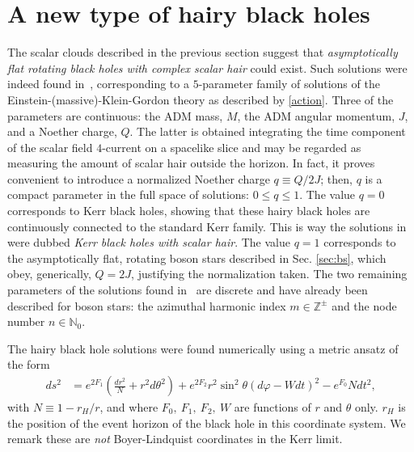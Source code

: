 \section{A new type of hairy black holes}
\label{sec:HBHs}
The scalar clouds described in the previous section suggest that \textit{asymptotically flat rotating black holes with complex scalar hair} could exist.
Such solutions were indeed found in~\cite{Herdeiro:2014goa}, corresponding to a $5$-parameter family of solutions of the Einstein-(massive)-Klein-Gordon theory as described by \eqref{action}.
Three of the parameters are continuous: the ADM mass, $M$, the ADM angular momentum, $J$, and a Noether charge, $Q$.
The latter is obtained integrating the time component of the scalar field $4$-current on a spacelike slice and may be regarded as measuring the amount of scalar hair outside the horizon.
In fact, it proves convenient to introduce a normalized Noether charge $q\equiv Q/2J$; then, $q$ is a compact parameter in the full space of solutions: $0\le q\le 1$.
The value $q=0$ corresponds to Kerr black holes, showing that these hairy black holes are continuously connected to the standard Kerr family.
This is way the solutions in~\cite{Herdeiro:2014goa} were dubbed \textit{Kerr black holes with scalar hair}.
The value $q=1$ corresponds to the asymptotically flat, rotating boson stars described in Sec. \ref{sec:bs}, which obey, generically, $Q=2J$, justifying the normalization taken.
The two remaining parameters of the solutions found in~\cite{Herdeiro:2014goa} are discrete and have already been described for boson stars: the azimuthal harmonic index $m\in \mathbb{Z}^\pm$ and the node number $n\in \mathbb{N}_0$. 

The hairy black hole solutions were found numerically using a metric ansatz of the form
\begin{align}
  ds^2 &= e^{2F_1}\left( \frac{dr^2}{N} + r^2d\theta^2 \right) + e^{2F_2}r^2\sin^2\theta \left( d\varphi - Wdt \right)^2 - e^{F_0}Ndt^2,
  \label{eqn:HBH-ansatz}
\end{align}
with $N\equiv 1-r_H/r$, and where $F_0,~F_1,~F_2,~W$ are functions of $r$ and $\theta$ only.
$r_H$ is the position of the event horizon of the black hole in this coordinate system.
We remark these are \textit{not} Boyer-Lindquist coordinates in the Kerr limit. 

